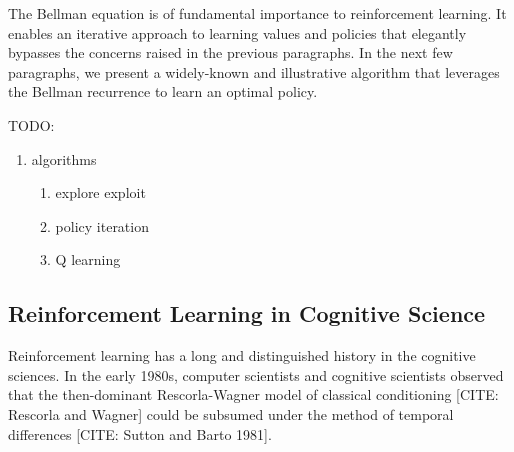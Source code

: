 The Bellman equation is of fundamental importance to reinforcement learning.
It enables an iterative approach to learning values and policies that elegantly bypasses the concerns raised in the previous paragraphs.
In the next few paragraphs, we present a widely-known and illustrative algorithm that leverages the Bellman recurrence to learn an optimal policy.


TODO:
\begin{enumerate}
	\item algorithms
		\begin{enumerate}
			\item explore exploit
			\item policy iteration
			\item Q learning
		\end{enumerate}
\end{enumerate}

\subsection{Reinforcement Learning in Cognitive Science}

Reinforcement learning has a long and distinguished history in the cognitive sciences.
In the early 1980s, computer scientists and cognitive scientists observed that the then-dominant Rescorla-Wagner model of classical conditioning [CITE: Rescorla and Wagner] could be subsumed under the method of temporal differences [CITE: Sutton and Barto 1981].

